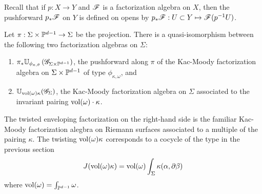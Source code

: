 Recall that if $p : X \to Y$ and $\mathscr F$ is a factorization algebra on $X$, then the pushforward $p_* \mathscr F$ on $Y$ is defined on opens by $p_* \mathscr F : U \subset Y \mapsto \mathscr F(p^{-1} U)$. 

\begin{prop}
Let $\pi : \Sigma \times \mathbb P^{d-1} \to \Sigma$ be the projection. 
There is a quasi-isomorphism between the following two factorization algebras on $\Sigma$:
\begin{enumerate}
\item $\pi_* \mathbb U_{\phi_{\kappa, \theta}} \left(\mathscr G_{\Sigma \times \mathbb P^{d-1}}\right)$, the pushforward along $\pi$ of the Kac-Moody factorization algebra on $\Sigma \times \mathbb P^{d-1}$ of type $\phi_{\kappa,\omega}$, and
\item $\mathbb U_{{\rm vol}(\omega) \kappa} (\mathscr G_\Sigma)$, the Kac-Moody factorization algebra on $\Sigma$ associated to the invariant pairing ${\rm vol}(\omega) \cdot \kappa$. 
\end{enumerate}
\end{prop}

The twisted enveloping factorization on the right-hand side is the familiar Kac-Moody factorization alegbra on Riemann surfaces associated to a multiple of the pairing $\kappa$.
The twisting ${\rm vol}(\omega) \kappa$ corresponds to a cocycle of the type in the previous section 
\[
J({\rm vol}(\omega) \kappa) = {\rm vol}(\omega) \int_\Sigma \kappa(\alpha, \partial \beta)
\]
where ${\rm vol}(\omega) = \int_{\mathbb P^{d-1}} \omega$. 

